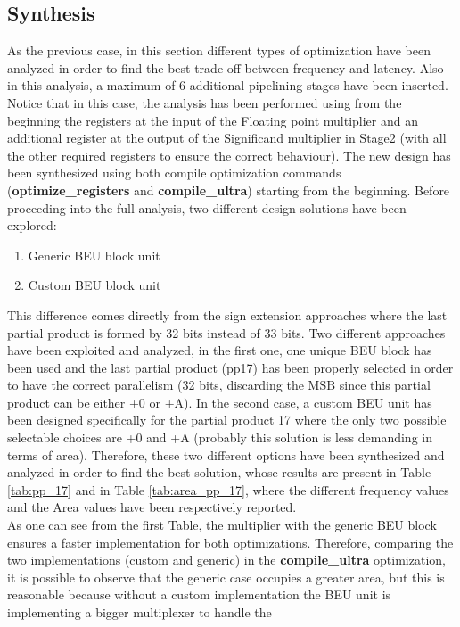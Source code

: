 \documentclass[a4paper, titlepage]{article}
\begin{document}
\subsection{Synthesis}
As the previous case, in this section different types of optimization have been analyzed in order to find the best trade-off between frequency and latency. Also in this analysis, a maximum of 6 additional pipelining stages have been inserted.
\newline Notice that in this case, the analysis has been performed using from the beginning the registers at the input of the Floating point multiplier and an additional register at the output of the Significand multiplier in Stage2 (with all the other required registers to ensure the correct behaviour).
\newline
The new design has been synthesized using both compile optimization commands (\textbf{optimize\_registers} and \textbf{compile\_ultra}) starting from the beginning. \newline
Before proceeding into the full analysis, two different design solutions have been explored:
\begin{enumerate}
    \item Generic BEU block unit
    \item Custom BEU block unit
\end{enumerate}
This difference comes directly from the sign extension approaches where the last partial product is formed by 32 bits instead of 33 bits. Two different approaches have been exploited and analyzed, in the first one, one unique BEU block has been used and the last partial product (pp17) has been properly selected in order to have the correct parallelism (32 bits, discarding the MSB since this partial product can be either +0 or +A). In the second case, a custom BEU unit has been designed specifically for the partial product 17 where the only two possible selectable choices are +0 and +A (probably this solution is less demanding in terms of area). 
\newline
Therefore, these two different options have been synthesized and analyzed in order to find the best solution, 
whose results are present in Table \ref{tab:pp_17} and in Table \ref{tab:area_pp_17}, where the different frequency values and the Area values have been respectively reported.\\
As one can see from the first Table, the multiplier with the generic BEU block ensures a faster implementation for both optimizations. Therefore, comparing the two implementations (custom and generic) in the \textbf{compile\_ultra} optimization, it is possible to observe that the generic case occupies a greater area, but this is reasonable because without a custom implementation the BEU unit is implementing a bigger multiplexer to handle the
\end{document}

